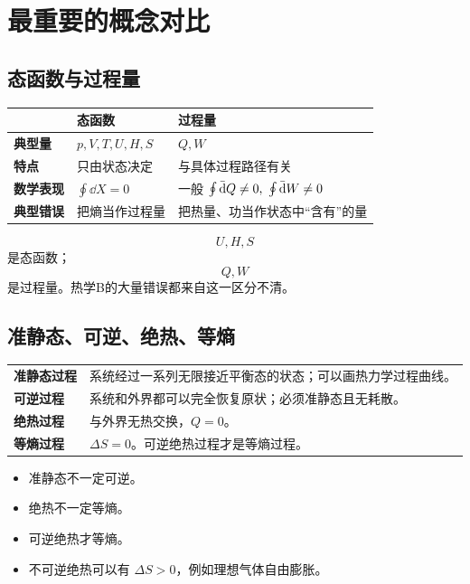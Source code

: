 \section{最重要的概念对比}

\subsection{态函数与过程量}

\begin{FormulaBox}[态函数与过程量]
\begin{tabularx}{\textwidth}{@{}>{\bfseries}lXX@{}}
 & 态函数 & 过程量\\
\midrule
典型量 & \(p,V,T,U,H,S\) & \(Q,W\)\\
特点 & 只由状态决定 & 与具体过程路径有关\\
数学表现 & \(\oint\dd X=0\) & 一般 \(\oint\mathop{}\!\bar{\mathrm{d}} Q\ne0,\ \oint\mathop{}\!\bar{\mathrm{d}} W\ne0\)\\
典型错误 & 把熵当作过程量 & 把热量、功当作状态中“含有”的量\\
\end{tabularx}
\end{FormulaBox}

\begin{WarnBox}[必须记住]
\[
  U,H,S
\]
是态函数；
\[
  Q,W
\]
是过程量。热学B的大量错误都来自这一区分不清。
\end{WarnBox}

\subsection{准静态、可逆、绝热、等熵}

\begin{FormulaBox}[四个概念不要混]
\begin{tabularx}{\textwidth}{@{}>{\bfseries}lX@{}}
准静态过程 & 系统经过一系列无限接近平衡态的状态；可以画热力学过程曲线。\\
可逆过程 & 系统和外界都可以完全恢复原状；必须准静态且无耗散。\\
绝热过程 & 与外界无热交换，\(Q=0\)。\\
等熵过程 & \(\Delta S=0\)。可逆绝热过程才是等熵过程。\\
\end{tabularx}
\end{FormulaBox}

\begin{WarnBox}[高频陷阱]
\begin{itemize}
  \item 准静态不一定可逆。
  \item 绝热不一定等熵。
  \item 可逆绝热才等熵。
  \item 不可逆绝热可以有 \(\Delta S>0\)，例如理想气体自由膨胀。
\end{itemize}
\end{WarnBox}

